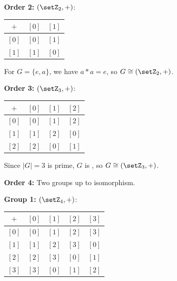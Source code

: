 \begin{enumerate}
\begin{subprove}
    \textbf{Order 2:} \((\setZ_{2}, +)\):
    \begin{center}
    \begin{tabular}{|c|c|c|}
    \hline
    \(+\) & \([0]\) & \([1]\) \\
    \hline
    \([0]\) & \([0]\) & \([1]\) \\
    \hline
    \([1]\) & \([1]\) & \([0]\) \\
    \hline
    \end{tabular}
    \end{center}
    For \(G = \{e, a\}\), we have \(a * a = e\), so \(G \cong (\setZ_{2}, +)\).
    
    \textbf{Order 3:} \((\setZ_{3}, +)\):
    \begin{center}
    \begin{tabular}{|c|c|c|c|}
    \hline
    \(+\) & \([0]\) & \([1]\) & \([2]\) \\
    \hline
    \([0]\) & \([0]\) & \([1]\) & \([2]\) \\
    \hline
    \([1]\) & \([1]\) & \([2]\) & \([0]\) \\
    \hline
    \([2]\) & \([2]\) & \([0]\) & \([1]\) \\
    \hline
    \end{tabular}
    \end{center}
    Since \(|G| = 3\) is prime, \(G\) is , so \(G \cong (\setZ_{3}, +)\).
    
    \textbf{Order 4:} Two groups up to isomorphism.
    
    \textbf{Group 1:} \((\setZ_{4}, +)\):
    \begin{center}
    \begin{tabular}{|c|c|c|c|c|}
    \hline
    \(+\) & \([0]\) & \([1]\) & \([2]\) & \([3]\) \\
    \hline
    \([0]\) & \([0]\) & \([1]\) & \([2]\) & \([3]\) \\
    \hline
    \([1]\) & \([1]\) & \([2]\) & \([3]\) & \([0]\) \\
    \hline
    \([2]\) & \([2]\) & \([3]\) & \([0]\) & \([1]\) \\
    \hline
    \([3]\) & \([3]\) & \([0]\) & \([1]\) & \([2]\) \\
    \hline
    \end{tabular}
    \end{center}
    

\end{subprove}
\end{enumerate}
